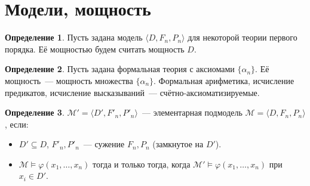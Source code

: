 \documentclass[a4paper,11pt]{article}
\theoremstyle{definition}
\newtheorem*{dfn}{Определение}
\begin{document}
\section{Модели, мощность}
\begin{dfn}
Пусть задана модель $\langle D, F_n, P_n\rangle$ для некоторой теории первого
порядка. Её мощностью будем считать мощность $D$.
\end{dfn}
\begin{dfn}
Пусть задана формальная теория с аксиомами $\{\alpha_n\}$. Её мощность~---
мощность множества $\{\alpha_n\}$. Формальная арифметика, исчисление предикатов,
исчисление высказываний~--- счётно-аксиоматизируемые.
\end{dfn}
\begin{dfn}
$\mathcal{M}' = \langle D', F'_n, P'_n\rangle$~--- элементарная подмодель
$\mathcal{M} = \langle D, F_n, P_n\rangle$, если:
\begin{itemize}
\item $D' \subseteq D$, $F'_n, P'_n$~--- сужение $F_n, P_n$ (замкнутое на $D'$).
\item $\mathcal{M} \models \varphi(x_1, \dots, x_n)$ тогда и только тогда, когда
  $\mathcal{M}' \models \varphi(x_1, \dots, x_n)$ при $x_i \in D'$.
\end{itemize}
\end{dfn}
\end{document}
